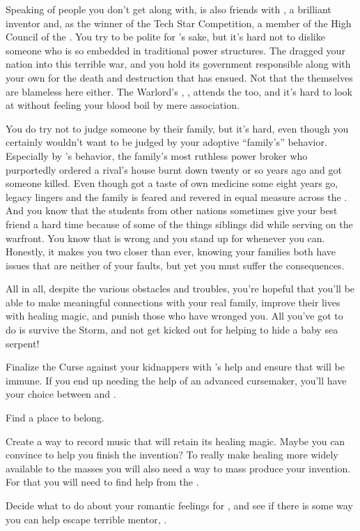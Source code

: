 \documentclass[char]{GL2020}
\begin{document}
Speaking of people you don’t get along with, \cDisney{} is also friends with \cTechStar{\full}, a brilliant inventor and, as the winner of the Tech Star Competition, a member of the High Council of the \pTech{}. You try to be polite for \cDisney{}’s sake, but it's hard not to dislike someone who is so embedded in traditional power structures. The \pTech{} dragged your nation into this terrible war, and you hold its government responsible along with your own for the death and destruction that has ensued. Not that the \pShip{} themselves are blameless here either. The Warlord's \cWarlordDaughter{\child}, \cWarlordDaughter{}, attends the \pSchool{} too, and it's hard to look at \cWarlordDaughter{\them} without feeling your blood boil by mere association. 

You do try not to judge someone by their family, but it’s hard, even though you certainly wouldn't want to be judged by your adoptive ``family’s” behavior. Especially by \cEvilNemesis{\full}’s behavior, the family’s most ruthless power broker who purportedly ordered a rival’s house burnt down twenty or so years ago and got someone killed. Even though \cEvilNemesis{\they} got a taste of \cEvilNemesis{\their} own medicine some eight years go, \cEvilNemesis{\their} legacy lingers and the \cAdopted{\formal} family is feared and revered in equal measure across the \pFarm{}. And you know that the students from other nations sometimes give your best friend \cLibAssist{} a hard time because of some of the things \cLibAssist{\their} siblings did while serving on the warfront. You know that is wrong and you stand up for \cLibAssist{} whenever you can. Honestly, it makes you two closer than ever, knowing your families both have issues that are neither of your faults, but yet you must suffer the consequences.

All in all, despite the various obstacles and troubles, you're hopeful that you'll be able to make meaningful connections with your real family, improve their lives with healing magic, and punish those who have wronged you. All you've got to do is survive the Storm, and not get kicked out for helping to hide a baby sea serpent!

\begin{itemz}
    \item Finalize the Curse against your kidnappers with \cLibAssist{}’s help and ensure that \cMusic{} will be immune. If you end up needing the help of an advanced cursemaker, you’ll have your choice between \cPrince{} and \cCurse{}.
    \item Find a place to belong.
    \item Create a way to record music that will retain its healing magic. Maybe you can convince \cInterpol{} to help you finish the invention? To really make healing more widely available to the masses you will also need a way to mass produce your invention. For that you will need to find help from the \pTech{}.
    \item Decide what to do about your romantic feelings for \cScholarship{}, and see if there is some way you can help \cScholarship{\them} escape \cScholarship{\their} terrible mentor, \cAntiChup{}.
\end{itemz}
\end{document}
